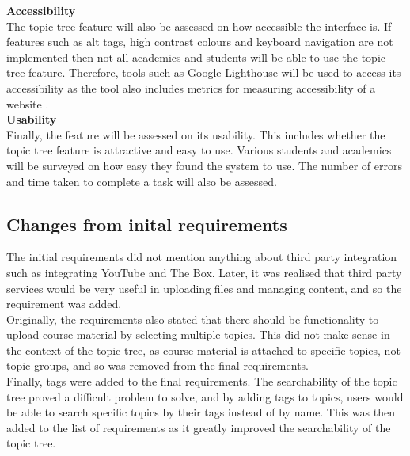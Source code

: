 \textbf{Accessibility} \\
The topic tree feature will also be assessed on how accessible the interface is. If features such as alt tags, high contrast colours and keyboard navigation are not implemented then not all academics and students will be able to use the topic tree feature. Therefore, tools such as Google Lighthouse will be used to access its accessibility as the tool also includes metrics for measuring accessibility of a website \cite{googleLighthouseAccessibility}. \\

\textbf{Usability} \\
Finally, the feature will be assessed on its usability. This includes whether the topic tree feature is attractive and easy to use. Various students and academics will be surveyed on how easy they found the system to use. The number of errors and time taken to complete a task will also be assessed.\\

\subsection {Changes from inital requirements}

The initial requirements did not mention anything about third party integration such as integrating YouTube and The Box. Later, it was realised that third party services would be very useful in uploading files and managing content, and so the requirement was added.\\

Originally, the requirements also stated that there should be functionality to upload course material by selecting multiple topics. This did not make sense in the context of the topic tree, as course material is attached to specific topics, not topic groups, and so was removed from the final requirements.\\

Finally, tags were added to the final requirements. The searchability of the topic tree proved a difficult problem to solve, and by adding tags to topics, users would be able to search specific topics by their tags instead of by name. This was then added to the list of requirements as it greatly improved the searchability of the topic tree.\\